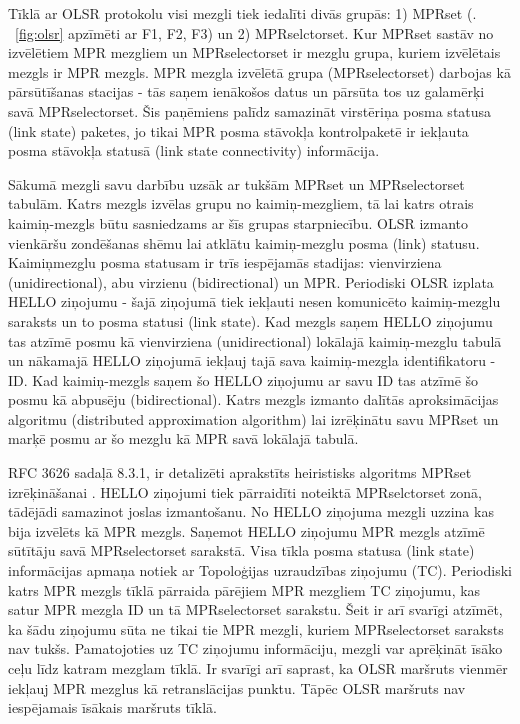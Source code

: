 Tīklā ar OLSR protokolu visi mezgli tiek iedalīti divās grupās: 1) MPRset (\figurename. ~\ref{fig:olsr} apzīmēti ar F1, F2, F3) un 2) MPRselctorset. Kur MPRset sastāv no izvēlētiem MPR mezgliem un MPRselectorset ir mezglu grupa, kuriem izvēlētais mezgls ir MPR mezgls. MPR mezgla izvēlētā grupa (MPRselectorset) darbojas kā pārsūtīšanas stacijas - tās saņem ienākošos datus un pārsūta tos uz galamērķi savā MPRselectorset. Šis paņēmiens palīdz samazināt virstēriņa posma statusa (link state) paketes, jo tikai MPR posma stāvokļa kontrolpaketē ir iekļauta posma stāvokļa statusā (link state connectivity) informācija.

Sākumā mezgli savu darbību uzsāk ar tukšām MPRset un MPRselectorset tabulām. Katrs mezgls izvēlas grupu no kaimiņ-mezgliem, tā lai katrs otrais kaimiņ-mezgls būtu sasniedzams ar šīs grupas starpniecību. OLSR izmanto vienkāršu zondēšanas shēmu lai atklātu kaimiņ-mezglu posma (link) statusu. Kaimiņmezglu posma statusam ir trīs iespējamās stadijas: vienvirziena (unidirectional), abu virzienu (bidirectional) un MPR. Periodiski OLSR izplata HELLO ziņojumu - šajā ziņojumā tiek iekļauti nesen komunicēto kaimiņ-mezglu saraksts un to posma statusi (link state). Kad mezgls saņem HELLO ziņojumu tas atzīmē posmu kā vienvirziena (unidirectional) lokālajā kaimiņ-mezglu tabulā un nākamajā HELLO ziņojumā iekļauj tajā sava kaimiņ-mezgla identifikatoru - ID. Kad kaimiņ-mezgls saņem šo HELLO ziņojumu ar savu ID tas atzīmē šo posmu kā abpusēju (bidirectional). Katrs mezgls izmanto dalītās aproksimācijas algoritmu (distributed approximation algorithm) lai izrēķinātu savu MPRset un marķē posmu ar šo mezglu kā MPR savā lokālajā tabulā.

RFC 3626  sadaļā 8.3.1, ir detalizēti aprakstīts heiristisks algoritms MPRset izrēķināšanai \cite{rfc3626}. HELLO ziņojumi tiek pārraidīti noteiktā MPRselctorset zonā, tādējādi samazinot joslas izmantošanu. No HELLO ziņojuma mezgli uzzina kas bija izvēlēts kā MPR mezgls. Saņemot HELLO ziņojumu MPR mezgls atzīmē sūtītāju savā MPRselectorset sarakstā. Visa tīkla posma statusa (link state) informācijas apmaņa notiek ar Topoloģijas uzraudzības ziņojumu (\acs{TC}). Periodiski katrs MPR mezgls tīklā pārraida pārējiem MPR mezgliem TC ziņojumu, kas satur MPR mezgla ID un tā MPRselectorset sarakstu. Šeit ir arī svarīgi atzīmēt, ka šādu ziņojumu sūta ne tikai tie MPR mezgli, kuriem MPRselectorset saraksts nav tukšs. Pamatojoties uz TC ziņojumu informāciju, mezgli var aprēķināt īsāko ceļu līdz katram mezglam tīklā. Ir svarīgi arī saprast, ka OLSR maršruts vienmēr iekļauj MPR mezglus kā retranslācijas punktu. Tāpēc OLSR maršruts nav iespējamais īsākais maršruts tīklā.

